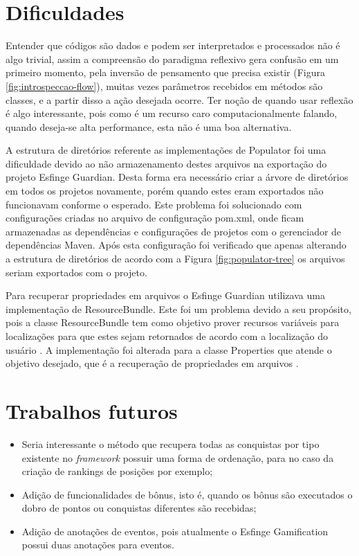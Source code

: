 \section{Dificuldades}

\par Entender que códigos são dados e podem ser interpretados e processados não é algo trivial, assim a compreensão do paradigma reflexivo gera confusão em um primeiro momento, pela inversão de pensamento que precisa existir (Figura \ref{fig:introspeccao-flow}), muitas vezes parâmetros recebidos em métodos são classes, e a partir disso a ação desejada ocorre. Ter noção de quando usar reflexão é algo interessante, pois como é um recurso caro computacionalmente falando, quando deseja-se alta performance, esta não é uma boa alternativa.

\par A estrutura de diretórios referente as implementações de Populator foi uma dificuldade devido ao não armazenamento destes arquivos na exportação do projeto Esfinge Guardian. Desta forma era necessário criar a árvore de diretórios em todos os projetos novamente, porém quando estes eram exportados não funcionavam conforme o esperado. Este problema foi solucionado com configurações criadas no arquivo de configuração pom.xml, onde ficam armazenadas as dependências e configurações de projetos com o gerenciador de dependências Maven. Após esta configuração foi verificado que apenas alterando a estrutura de diretórios de acordo com a Figura \ref{fig:populator-tree} os arquivos seriam exportados com o projeto.

\par Para recuperar propriedades em arquivos o Esfinge Guardian utilizava uma implementação de ResourceBundle. Este foi um problema devido a seu propósito, pois a classe ResourceBundle tem como objetivo prover recursos variáveis para localizações para que estes sejam retornados de acordo com a localização do usuário \cite{oracleeesourcebundle}. A implementação foi alterada para a classe Properties que atende o objetivo desejado, que é a recuperação de propriedades em arquivos \cite{oracleproperties}.

\section{Trabalhos futuros}

\begin{itemize}
    \item Seria interessante o método que recupera todas as conquistas por tipo existente no \textit{framework} possuir uma forma de ordenação, para no caso da criação de rankings de posições por exemplo;
    \item Adição de funcionalidades de bônus, isto é, quando os bônus são executados o dobro de pontos ou conquistas diferentes são recebidas;
    \item Adição de anotações de eventos, pois atualmente o Esfinge Gamification possui duas anotações para eventos.
    
\end{itemize}